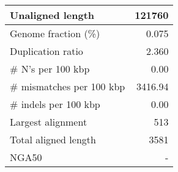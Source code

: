 \documentclass[12pt,a4paper]{article}
\begin{document}
\begin{table}[ht]
\begin{center}
\begin{tabular}{|l*{1}{|r}|}
Unaligned length & 121760 \\ \hline
Genome fraction (\%) & 0.075 \\ \hline
Duplication ratio & 2.360 \\ \hline
\# N's per 100 kbp & 0.00 \\ \hline
\# mismatches per 100 kbp & 3416.94 \\ \hline
\# indels per 100 kbp & 0.00 \\ \hline
Largest alignment & 513 \\ \hline
Total aligned length & 3581 \\ \hline
NGA50 & - \\ \hline
\end{tabular}
\end{center}
\end{table}
\end{document}
